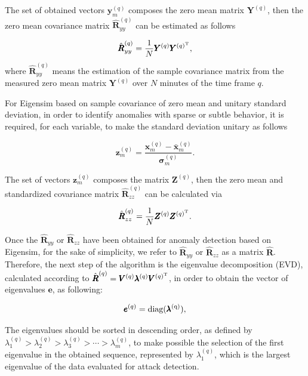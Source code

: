 The set of obtained vectors $\pmb{y}_{m}^{(q)}$ composes the zero mean matrix $\pmb{Y}^{(q)}$, then the zero mean covariance matrix $\hat{\pmb{R}}_{yy}^{(q)}$ can be estimated as follows

\begin{equation}\label{eq:3.04}
	\hat{\pmb{R}}_{yy}^{(q)} = \frac{1}{N}\pmb{Y}^{(q)}\pmb{Y}^{(q)^{\rm T}},
\end{equation}
where $\hat{\pmb{R}}_{yy}^{(q)}$ means the estimation of the sample covariance matrix from the measured zero mean matrix $\pmb{Y}^{(q)}$ over $N$ minutes of the time frame $q$. 

For Eigensim based on sample covariance of zero mean and unitary standard deviation, in order to identify anomalies with sparse or subtle behavior, it is required, for each variable, to make the standard deviation unitary as follows

\begin{equation}\label{eq:3.05}
	\pmb{z}_{m}^{(q)} = \frac{\pmb{x}_{m}^{(q)} - \bar{\pmb{x}}_{m}^{(q)}}{\pmb{\sigma}_{m}^{(q)}}.
\end{equation}

The set of vectors $\pmb{z}_{m}^{(q)}$ composes the matrix $\pmb{Z}^{(q)}$, then the zero mean and standardized covariance matrix $\hat{\pmb{R}}_{zz}^{(q)}$ can be calculated via 

\begin{equation}\label{eq:3.06}
	\hat{\pmb{R}}_{zz}^{(q)} = \frac{1}{N}\pmb{Z}^{(q)}\pmb{Z}^{(q)^{\rm T}}.
\end{equation}

Once the $\hat{\pmb{R}}_{yy}$ or $\hat{\pmb{R}}_{zz}$ have been obtained for anomaly detection based on Eigensim, for the sake of simplicity, we refer to $\hat{\pmb{R}}_{yy}$ or $\hat{\pmb{R}}_{zz}$ as a matrix $\hat{\pmb{R}}$. Therefore, the next step of the algorithm is the eigenvalue decomposition (EVD), calculated according to $\hat{\pmb{R}}^{(q)} = \pmb{V}^{(q)}\pmb{\lambda}^{(q)}\pmb{V}^{(q)^{\rm T}}$, in order to obtain the vector of eigenvalues $\pmb{e}$, as following:

\begin{equation}\label{eq:3.07}
	\pmb{e}^{(q)} = \rm diag(\pmb{\lambda}^{(q)}),
\end{equation}

The eigenvalues should be sorted in descending order, as defined by $\lambda_{1}^{(q)} > \lambda_{2}^{(q)} > \lambda_{3}^{(q)} > \cdots > \lambda_{m}^{(q)}$, to make possible the selection of the first eigenvalue in the obtained sequence, represented by $\lambda_{1}^{(q)}$, which is the largest eigenvalue of the data evaluated for attack detection.

